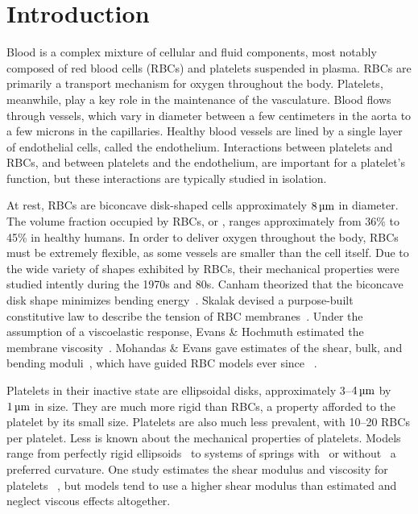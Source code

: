 \section{Introduction}

Blood is a complex mixture of cellular and fluid components, most notably composed of red
blood cells (RBCs) and platelets suspended in plasma. RBCs are primarily a transport
mechanism for oxygen throughout the body. Platelets, meanwhile, play a key role in the
maintenance of the vasculature. Blood flows through vessels, which vary in diameter
between a few centimeters in the aorta to a few microns in the capillaries. Healthy blood
vessels are lined by a single layer of endothelial cells, called the endothelium.
Interactions between platelets and RBCs, and between platelets and the endothelium, are
important for a platelet's function, but these interactions are typically studied in
isolation.

At rest, RBCs are biconcave disk-shaped cells approximately $8\um$ in diameter. The
volume fraction occupied by RBCs, or , ranges approximately from 36\% to
45\% in healthy humans. In order to deliver oxygen throughout the body, RBCs must be
extremely flexible, as some vessels are smaller than the cell itself. Due to the wide
variety of shapes exhibited by RBCs, their mechanical properties were studied intently
during the 1970s and 80s. Canham theorized that the biconcave disk shape minimizes
bending energy~\cite{Canham:1970wx}. Skalak  devised a purpose-built
constitutive law to describe the tension of RBC membranes~\cite{Skalak:1973tp}. Under the
assumption of a viscoelastic response, Evans \& Hochmuth estimated the membrane
viscosity~\cite{Evans:1976tx}. Mohandas \& Evans gave estimates of the shear, bulk, and
bending moduli~\cite{Mohandas:1994tg}, which have guided RBC models ever since~%
\cite{Pozrikidis:2003ft,Fai:2013do}.

Platelets in their inactive state are ellipsoidal disks, approximately 3--$4\um$ by
$1\um$ in size. They are much more rigid than RBCs, a property afforded to the platelet
by its small size. Platelets are also much less prevalent, with 10--20 RBCs per platelet.
Less is known about the mechanical properties of platelets. Models range from perfectly
rigid ellipsoids~\cite{Wang:2013gs} to systems of springs with~%
\cite{Erickson:2010ep,Skorczewski:2013jn} or without~\cite{Wu:2014gt} a preferred
curvature. One study estimates the shear modulus and viscosity for platelets~%
\cite{Haga:1998wa}, but models tend to use a higher shear modulus than estimated and
neglect viscous effects altogether.

